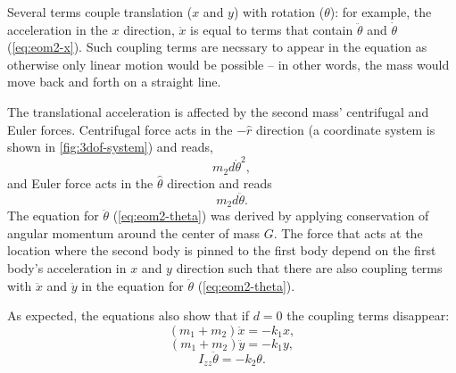 \documentclass{article}
\begin{document}
Several terms couple translation ($x$ and $y$) with rotation ($\theta$): for example, the acceleration in the $x$ direction, $\ddot{x}$ is equal to terms that contain $\ddot{\theta}$ and $\dot{\theta}$ (\autoref{eq:eom2-x}). Such coupling terms are necssary to appear in the equation as otherwise only linear motion would be possible -- in other words, the mass would move back and forth on a straight line.
\par 
The translational acceleration is affected by the second mass' centrifugal and Euler forces. Centrifugal force acts in the $-\hat{r}$ direction (a coordinate system is shown in \autoref{fig:3dof-system}) and reads, 
\begin{equation}
    m_2 d \dot{\theta}^2,
\end{equation}
and Euler force acts in the $\hat{\theta}$ direction and reads
\begin{equation}
    m_2 d \ddot{\theta}.
\end{equation}
The equation for $\ddot{\theta}$ (\autoref{eq:eom2-theta}) was derived by applying conservation of angular momentum around the center of mass $G$. The force that acts at the location where the second body is pinned to the first body depend on the first body's acceleration in $x$ and $y$ direction such that there are also coupling terms with $\ddot{x}$ and $\ddot{y}$ in the equation for $\ddot{\theta}$  (\autoref{eq:eom2-theta}).
\par 
As expected, the equations also show that if $d=0$ the coupling terms disappear:
\begin{equation}
    (m_1 + m_2) \ddot{x} = - k_1 x,
\end{equation}
\begin{equation}
   (m_1 + m_2) \ddot{y} = - k_1 y,
\end{equation}
\begin{equation}
    I_{zz}\ddot{\theta} = - k_2 \theta.
\end{equation}
\end{document}
